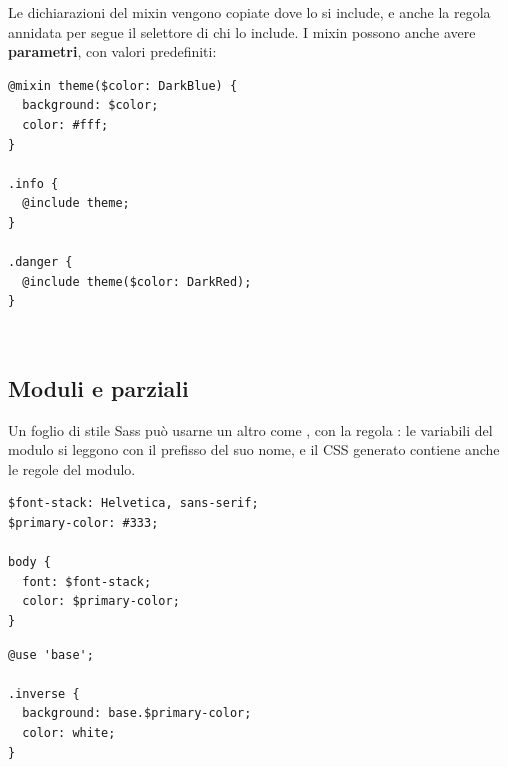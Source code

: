 Le dichiarazioni del mixin vengono copiate dove lo si include, e anche la regola
annidata per  segue il selettore di chi lo include. I mixin possono
anche avere \textbf{parametri}, con valori predefiniti:

\begin{affianco}[0.45]
\begin{lstlisting}[style=css, name=theme.scss]
@mixin theme($color: DarkBlue) {
  background: $color;
  color: #fff;
}

.info {
  @include theme;
}

.danger {
  @include theme($color: DarkRed);
}
\end{lstlisting}
\risultato
{}
\begin{browser}[theme]
  \colorbox{css-darkblue}{}\\[3pt]
  \colorbox{css-darkred}{}
\end{browser}
\end{affianco}

\subsection{Moduli e parziali}

Un foglio di stile Sass può usarne un altro come , con la regola
: le variabili del modulo si leggono con il prefisso del suo nome, e
il CSS generato contiene anche le regole del modulo.

\begin{affianco}[0.45]
\begin{lstlisting}[style=css, name=base.scss]
$font-stack: Helvetica, sans-serif;
$primary-color: #333;

body {
  font: $font-stack;
  color: $primary-color;
}
\end{lstlisting}
\begin{lstlisting}[style=css, name=example.scss]
@use 'base';

.inverse {
  background: base.$primary-color;
  color: white;
}
\end{lstlisting}
\risultato
{}
\end{affianco}

